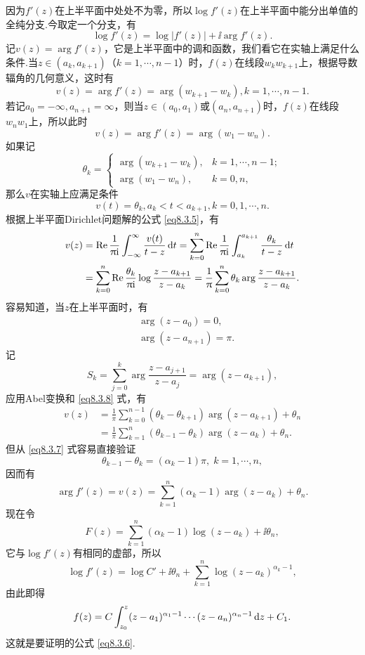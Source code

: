 因为$f'(z)$在上半平面中处处不为零，所以$\log f'(z)$在上半平面中能分出单值的全纯分支.今取定一个分支，有
\[
  \log f'(z) = \log|f'(z)| + \ii\arg f'(z).
\]
记$v(z)=\arg f'(z)$，它是上半平面中的调和函数，我们看它在实轴上满足什么条件.当$z\in(a_k,a_{k+1})$（$k=1,\cdots,n-1$）时，$f(z)$在线段$w_kw_{k+1}$上，根据导数辐角的几何意义，这时有
\[
  v(z) = \arg f'(z) = \arg (w_{k+1}-w_k), k = 1,\cdots,n-1.
\]
若记$a_0=-\infty,a_{n+1}=\infty$，则当$z\in(a_0,a_1)$或$(a_n,a_{n+1})$时，$f(z)$在线段$w_nw_1$上，所以此时
\[
  v(z) = \arg f'(z) = \arg(w_1-w_n).
\]
如果记
\begin{equation}\label{eq8.3.7}
  \theta_k = \begin{cases}
    \arg(w_{k+1}-w_k), & k = 1,\cdots,n-1;\\
    \arg(w_1-w_n), & k = 0, n ,
  \end{cases}
\end{equation}
那么$v$在实轴上应满足条件
\[
  v(t) = \theta_k,a_k < t < a_{k+1},k = 0,1,\cdots,n.
\]
根据上半平面Dirichlet问题解的公式 \eqref{eq8.3.5}，有
\begin{align*}
  v(z) & = \operatorname{Re}\frac1{\uppi\mathrm i}\int_{-\infty}^\infty\frac{v(t)}{t-z}\mathop{}\!\mathrm{d} t
  = \sum_{k=0}^n\operatorname{Re}\frac1{\uppi\mathrm i}\int_{a_k}^{a_{k+1}}\frac{\theta_k}{t-z}\mathop{}\!\mathrm{d} t\\
  & =\sum_{k=0}^n\operatorname{Re}\frac{\theta_k}{\uppi\mathrm i}\log\frac{z-a_{k+1}}{z-a_k}
  = \frac1{\uppi}\sum_{k=0}^n\theta_k\arg\frac{z-a_{k+1}}{z-a_k}.
\end{align*}
容易知道，当$z$在上半平面时，有
\begin{equation}\label{eq8.3.8}
  \begin{aligned}
    & \arg(z-a_0) = 0,\\
    & \arg(z-a_{n+1}) = \pi.
  \end{aligned}
\end{equation}
记
\[
  S_k = \sum_{j=0}^k\arg\frac{z-a_{j+1}}{z-a_j} = \arg(z-a_{k+1}),
\]
应用Abel变换和 \eqref{eq8.3.8} 式，有
\begin{align*}
  v(z) & = \frac1\pi\sum_{k=0}^{n-1}(\theta_k-\theta_{k+1})\arg(z-a_{k+1}) + \theta_n\\
  & = \frac1\pi\sum_{k=1}^n(\theta_{k-1}-\theta_k)\arg(z-a_k)+\theta_n.
\end{align*}
但从 \eqref{eq8.3.7} 式容易直接验证
\[
  \theta_{k-1} - \theta_k = (\alpha_k-1)\pi,\;k=1,\cdots,n,
\]
因而有
\[
  \arg f'(z) = v(z) = \sum_{k=1}^n(\alpha_k-1)\arg(z-a_k)+\theta_n.
\]
现在令
\[F(z)=\sum_{k=1}^n(\alpha_k-1)\log(z-a_k)+\ii\theta_n,\]
它与$\log f'(z)$有相同的虚部，所以
\[
  \log f'(z) = \log C' + \ii\theta_n + \sum_{k=1}^n\log(z-a_k)^{\alpha_k-1},
\]
由此即得
\begin{equation*}
  f(z) = C\int_{z_0}^z(z-a_1)^{\alpha_1-1}\cdots(z-a_n)^{\alpha_n-1}\mathop{}\!\mathrm dz+C_1.
\end{equation*}
这就是要证明的公式 \eqref{eq8.3.6}.

